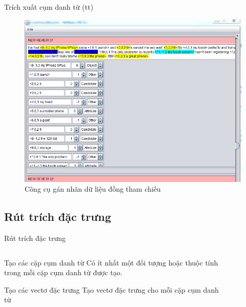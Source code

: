 \documentclass[9pt,xcolor=table,hyperref=unicode]{beamer}
\begin{document}
	\begin{frame}{Trích xuất cụm danh từ (tt)}
		\begin{figure}[H]
			\centering							
			\includegraphics[scale=0.45]{images/markup_tool}				
			\caption{Công cụ gán nhãn dữ liệu đồng tham chiếu}				
		\end{figure}
	\end{frame}

	\subsection{Rút trích đặc trưng}
	\begin{frame}{Rút trích đặc trưng}				
		\begin{columns}[t]
			\begin{column}{0.7\textwidth}
			   	\begin{block}{Tạo các cặp cụm danh từ}
					Có ít nhất một đối tượng hoặc thuộc tính trong mỗi cặp cụm danh từ được tạo.
				\end{block}
				\begin{block}{Tạo các vectơ đặc trưng}										
					Tạo vectơ đặc trưng cho mỗi cặp cụm danh từ
				\end{block}
			\end{column}
			\begin{column}{0.3\textwidth}  %
			 	\begin{figure}[H]
					\fontsize{13pt}{13}\selectfont
					\centering				
					\resizebox{20mm}{!}{}	
				\end{figure}
			\end{column}
		\end{columns}
		\begin{columns}[t]			
			\begin{column}{\textwidth}				
			   	\begin{figure}[H]
					\LARGE 
					\resizebox{100mm}{!}{}										
				\end{figure}
			\end{column}			
		\end{columns}
	\end{frame}	
\end{document}
